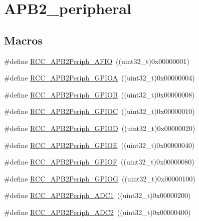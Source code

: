 \hypertarget{group___a_p_b2__peripheral}{}\section{A\+P\+B2\+\_\+peripheral}
\label{group___a_p_b2__peripheral}
\subsection*{Macros}
\begin{DoxyCompactItemize}
\item 
\#define \mbox{\hyperlink{group___a_p_b2__peripheral_ga5aa9469879ffa019d4836b0d297104c5}{R\+C\+C\+\_\+\+A\+P\+B2\+Periph\+\_\+\+A\+F\+IO}}~((uint32\+\_\+t)0x00000001)
\item 
\#define \mbox{\hyperlink{group___a_p_b2__peripheral_ga44b92fbf2e288796b1acbce2708f3636}{R\+C\+C\+\_\+\+A\+P\+B2\+Periph\+\_\+\+G\+P\+I\+OA}}~((uint32\+\_\+t)0x00000004)
\item 
\#define \mbox{\hyperlink{group___a_p_b2__peripheral_ga8c8909c3640508e9ce31dff80010a6dd}{R\+C\+C\+\_\+\+A\+P\+B2\+Periph\+\_\+\+G\+P\+I\+OB}}~((uint32\+\_\+t)0x00000008)
\item 
\#define \mbox{\hyperlink{group___a_p_b2__peripheral_gaf1f4b467becee1ff31ba2c54328a0115}{R\+C\+C\+\_\+\+A\+P\+B2\+Periph\+\_\+\+G\+P\+I\+OC}}~((uint32\+\_\+t)0x00000010)
\item 
\#define \mbox{\hyperlink{group___a_p_b2__peripheral_ga177200a365084af306e98389edeba42b}{R\+C\+C\+\_\+\+A\+P\+B2\+Periph\+\_\+\+G\+P\+I\+OD}}~((uint32\+\_\+t)0x00000020)
\item 
\#define \mbox{\hyperlink{group___a_p_b2__peripheral_gabc736c9892278ccd15848c6137d991fc}{R\+C\+C\+\_\+\+A\+P\+B2\+Periph\+\_\+\+G\+P\+I\+OE}}~((uint32\+\_\+t)0x00000040)
\item 
\#define \mbox{\hyperlink{group___a_p_b2__peripheral_ga2dbb1e1116b57621c585e1b52c894bda}{R\+C\+C\+\_\+\+A\+P\+B2\+Periph\+\_\+\+G\+P\+I\+OF}}~((uint32\+\_\+t)0x00000080)
\item 
\#define \mbox{\hyperlink{group___a_p_b2__peripheral_gaba82756d2060b97c62eb555242361b2e}{R\+C\+C\+\_\+\+A\+P\+B2\+Periph\+\_\+\+G\+P\+I\+OG}}~((uint32\+\_\+t)0x00000100)
\item 
\#define \mbox{\hyperlink{group___a_p_b2__peripheral_gacd24acb2cd5ca208652157f6c13d3145}{R\+C\+C\+\_\+\+A\+P\+B2\+Periph\+\_\+\+A\+D\+C1}}~((uint32\+\_\+t)0x00000200)
\item 
\#define \mbox{\hyperlink{group___a_p_b2__peripheral_ga4fd76e573e827702568d6064e33448b5}{R\+C\+C\+\_\+\+A\+P\+B2\+Periph\+\_\+\+A\+D\+C2}}~((uint32\+\_\+t)0x00000400)

\end{DoxyCompactItemize}
